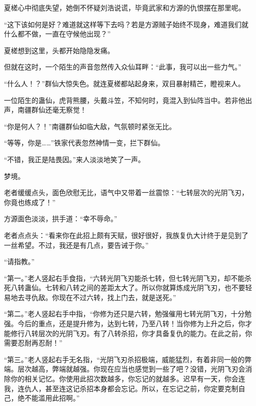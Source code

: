 \begin{this_body}
夏槎心中彻底失望，她倒不怀疑刘浩说谎，毕竟武家和方源的仇恨摆在那里呢。

“这下该如何是好？难道就这样等下去吗？若是方源贼子始终不现身，难道我们就什么都不做，一直在守候他出现？”

夏槎想到这里，头都开始隐隐发痛。

但就在这时，一个陌生的声音忽然传入众仙耳畔：“此事，我可以出一些力气。”

“什么人！？”群仙大惊失色。就连夏槎都站起身来，双目暴射精芒，瞪视来人。

一位陌生的蛊仙，虎背熊腰，头戴斗笠，不知何时，竟混入到仙阵当中。若非他出声，南疆群仙还毫无察觉！

“你是何人？！”南疆群仙如临大敌，气氛顿时紧张无比。

“等等，你是……”铁家代表忽然神情一变，拦下群仙。

“不错，我正是陆畏因。”来人淡淡地笑了一声。

梦境。

老者缓缓点头，面色欣慰无比，语气中又带着一丝震惊：“七转层次的光阴飞刃，你竟也练成了！”

方源面色淡淡，拱手道：“幸不辱命。”

老者点点头：“看来你在此招上颇有天赋，很好很好，我族复仇大计终于是见到了一丝希望。不过，我还是有几点，要告诫于你。”

“请指教。”

“第一。”老人竖起右手食指，“六转光阴飞刃能杀七转，但七转光阴飞刃，却不能杀死八转蛊仙。七转和八转之间的差距太大了。所以你就算炼成光阴飞刃，也不要轻易地去寻仇敌。你现在不过六转，找上门去，就是送死。”

“第二。”老人竖起右手中指，“你修为还只是六转，勉强催用七转光阴飞刃，十分勉强。今后的重点，还是提升修为，达到七转，乃至八转！当你修为上升之后，你才能修行八转层次的光阴飞刃。有了八转杀招，你才具备复仇的能力。在此之前，你需要忍耐再忍耐！”

“第三。”老人竖起右手无名指，“光阴飞刃杀招极端，威能猛烈，有着非同一般的弊端。层次越高，弊端就越强。你现在应当也感觉到一些了吧？没错，光阴飞刃会消除你的相关记忆。你使用此招次数越多，你忘记的就越多。迟早有一天，你会连我，连仇人，甚至连这记杀招本身都会忘记。所以，在忘记之前，你定要克制自己，绝不能滥用此招啊。”

\end{this_body}


